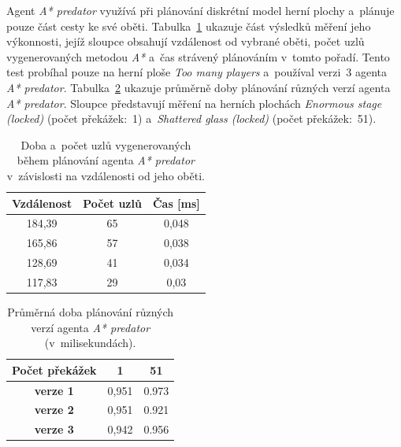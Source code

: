Agent \emph{A* predator} využívá při plánování diskrétní model herní plochy a~plánuje pouze část cesty ke své oběti. Tabulka~\ref{tab:benchmark-astar-predator-compare-ids} ukazuje část výsledků měření jeho výkonnosti, jejíž sloupce obsahují vzdálenost od vybrané oběti, počet uzlů vygenerovaných metodou \emph{A*} a~čas strávený plánováním v~tomto pořadí. Tento test probíhal pouze na herní ploše \emph{Too many players} a~používal verzi~3 agenta \emph{A* predator}. Tabulka~\ref{tab:benchmark-astar-predator-versions} ukazuje průměrně doby plánování různých verzí agenta \emph{A* predator}. Sloupce představují měření na herních plochách \emph{Enormous stage (locked)} (počet překážek:~1) a~\emph{Shattered glass (locked)} (počet překážek:~51).

\begin{table}[ht]
    \centering
    \begin{tabular}{|c|c|c|} \hline
        \textbf{Vzdálenost} & \textbf{Počet uzlů} & \textbf{Čas [ms]} \\ \hline
        184,39              & 65                  & 0,048             \\ \hline
        165,86              & 57                  & 0,038             \\ \hline
        128,69              & 41                  & 0,034             \\ \hline
        117,83              & 29                  & 0,03              \\ \hline
    \end{tabular}
    \caption{Doba a~počet uzlů vygenerovaných během plánování agenta \emph{A* predator} v~závislosti na vzdálenosti od jeho oběti.}
    \label{tab:benchmark-astar-predator-compare-ids}
\end{table}

\begin{table}[ht]
    \centering
    \begin{tabular}{|c|c|c|} \hline
        \textbf{Počet překážek} & \textbf{1}  & \textbf{51} \\ \hline\hline
        \textbf{verze 1}        & 0,951       & 0.973       \\ \hline
        \textbf{verze 2}        & 0,951       & 0.921       \\ \hline
        \textbf{verze 3}        & 0,942       & 0.956       \\ \hline
    \end{tabular}
    \caption{Průměrná doba plánování různých verzí agenta \emph{A* predator} (v~milisekundách).}
    \label{tab:benchmark-astar-predator-versions}
\end{table}

